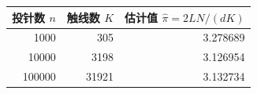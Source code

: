 \begin{tabular}{rrr}
\toprule
投针数 $n$ & 触线数 $K$ & 估计值 $\widehat{\pi}=2LN/(dK)$ \\
\midrule
1000 & 305 & 3.278689 \\
10000 & 3198 & 3.126954 \\
100000 & 31921 & 3.132734 \\
\bottomrule
\end{tabular}
